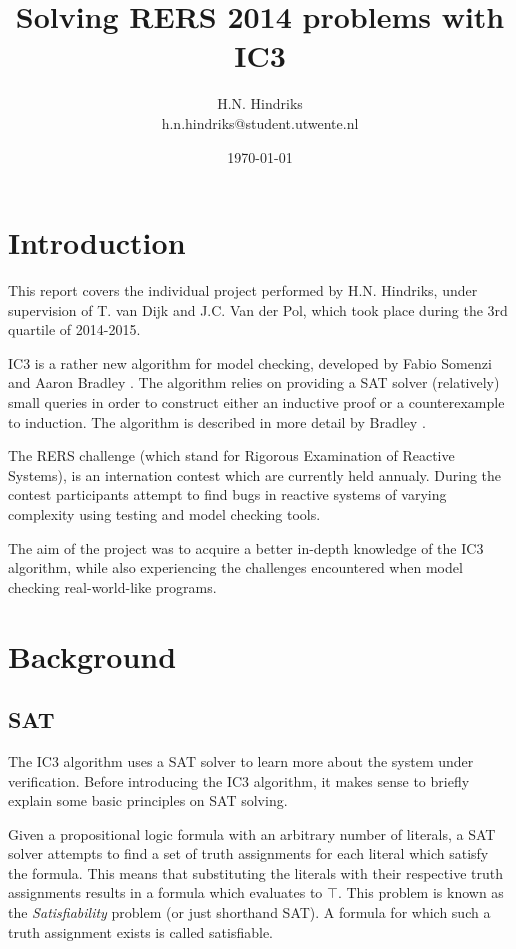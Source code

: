 \documentclass[a4paper]{article}
\begin{document}
\title{Solving RERS 2014 problems with IC3}
\author{H.N. Hindriks\\h.n.hindriks@student.utwente.nl}
\date{\today}
\maketitle

\section{Introduction}
This report covers the individual project performed by H.N. Hindriks, under supervision of T. van Dijk and J.C. Van der Pol, which took place during the 3rd quartile of 2014-2015.

IC3 is a rather new algorithm for model checking, developed by Fabio Somenzi and Aaron Bradley \cite{Bradley2007}. The algorithm relies on providing a SAT solver (relatively) small queries in order to construct either an inductive proof or a counterexample to induction. The algorithm is described in more detail by Bradley \cite{Bradley2011}.

The RERS challenge (which stand for Rigorous Examination of Reactive Systems), is an internation contest which are currently held annualy. During the contest participants attempt to find bugs in reactive systems of varying complexity using testing and model checking tools.

The aim of the project was to acquire a better in-depth knowledge of the IC3 algorithm, while also experiencing the challenges encountered when model checking real-world-like programs.

\section{Background}
\subsection{SAT}
The IC3 algorithm uses a SAT solver to learn more about the system under verification. Before introducing the IC3 algorithm, it makes sense to briefly explain some basic principles on SAT solving.

Given a propositional logic formula with an arbitrary number of literals, a SAT solver attempts to find a set of truth assignments for each literal which satisfy the formula. This means that substituting the literals with their respective truth assignments results in a formula which evaluates to $\top$.
This problem is known as the \emph{Satisfiability} problem (or just shorthand SAT). A formula for which such a truth assignment exists is called satisfiable.
\end{document}
